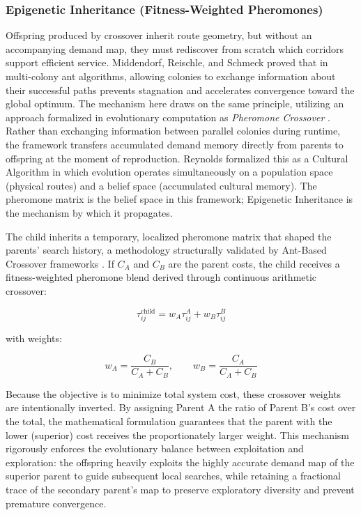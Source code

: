 {{\subsubsection{Epigenetic Inheritance (Fitness-Weighted Pheromones)}
\label{sec:epigenetic}
\noindent
Offspring produced by crossover inherit route geometry, but without an accompanying demand map, they must rediscover from scratch which corridors support efficient service. Middendorf, Reischle, and Schmeck \citeyearpar{middendorf2002multicolony} proved that in multi-colony ant algorithms, allowing colonies to exchange information about their successful paths prevents stagnation and accelerates convergence toward the global optimum. The mechanism here draws on the same principle, utilizing an approach formalized in evolutionary computation as \textit{Pheromone Crossover} \citep{dong2009multicolony}. Rather than exchanging information between parallel colonies during runtime, the framework transfers accumulated demand memory directly from parents to offspring at the moment of reproduction. Reynolds \citeyearpar{reynolds1994cultural} formalized this as a Cultural Algorithm in which evolution operates simultaneously on a population space (physical routes) and a belief space (accumulated cultural memory). The pheromone matrix is the belief space in this framework; Epigenetic Inheritance is the mechanism by which it propagates.

The child inherits a temporary, localized pheromone matrix that shaped the parents' search history, a methodology structurally validated by Ant-Based Crossover frameworks \citep{barz2003antbased}. If $C_A$ and $C_B$ are the parent costs, the child receives a fitness-weighted pheromone blend derived through continuous arithmetic crossover:

$$ \tau^{\text{child}}_{ij} = w_A \tau^A_{ij} + w_B \tau^B_{ij} $$

with weights:

$$ w_A = \frac{C_B}{C_A + C_B}, \qquad w_B = \frac{C_A}{C_A + C_B} $$

Because the objective is to minimize total system cost, these crossover weights are intentionally inverted. By assigning Parent A the ratio of Parent B's cost over the total, the mathematical formulation guarantees that the parent with the lower (superior) cost receives the proportionately larger weight. This mechanism rigorously enforces the evolutionary balance between exploitation and exploration: the offspring heavily exploits the highly accurate demand map of the superior parent to guide subsequent local searches, while retaining a fractional trace of the secondary parent's map to preserve exploratory diversity and prevent premature convergence.

}}
